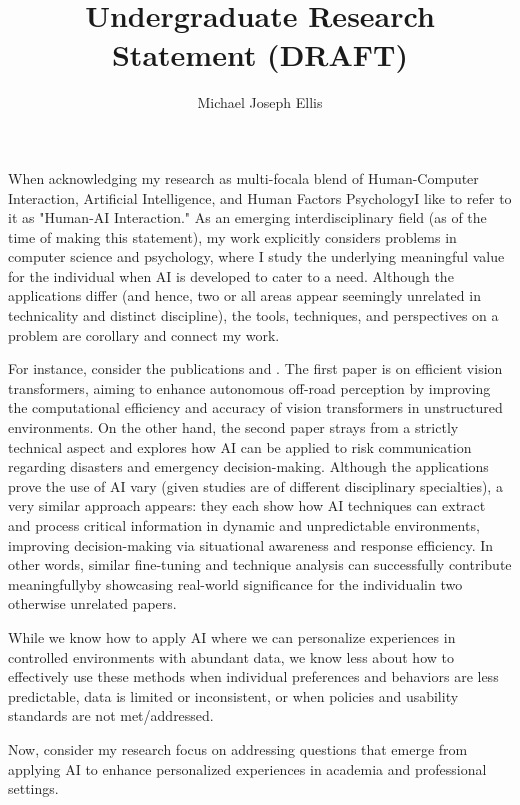 \documentclass{article}
\title{Undergraduate Research Statement (DRAFT)}
\author{Michael Joseph Ellis}
\date{}
\begin{document}
\maketitle

\indent When acknowledging my research as multi-focal\textemdash a blend of Human-Computer Interaction, Artificial Intelligence, and Human Factors Psychology\textemdash I like to refer to it as "Human-AI Interaction." As an emerging interdisciplinary field (as of the time of making this statement), my work explicitly considers problems in computer science and psychology, where I study the underlying meaningful value for the individual when AI is developed to cater to a need. Although the applications differ (and hence, two or all areas appear seemingly unrelated in technicality and distinct discipline), the tools, techniques, and perspectives on a problem are corollary and connect my work.

\indent For instance, consider the publications \cite{Efficient-Vision-Transformers-for-Autonomous-Systems} and \cite{AI-In-Disaster-Risk-Communication}. The first paper is on efficient vision transformers, aiming to enhance autonomous off-road perception by improving the computational efficiency and accuracy of vision transformers in unstructured environments. On the other hand, the second paper strays from a strictly technical aspect and explores how AI can be applied to risk communication regarding disasters and emergency decision-making. Although the applications prove the use of AI vary (given studies are of different disciplinary specialties), a very similar approach appears: they each show how AI techniques can extract and process critical information in dynamic and unpredictable environments, improving decision-making via situational awareness and response efficiency. In other words, similar fine-tuning and technique analysis can successfully contribute meaningfully\textemdash by showcasing real-world significance for the individual\textemdash in two otherwise unrelated papers.

\indent While we know how to apply AI where we can personalize experiences in controlled environments with abundant data, we know less about how to effectively use these methods when individual preferences and behaviors are less predictable, data is limited or inconsistent, or when policies and usability standards are not met/addressed. 

\vspace{10pt}\indent Now, consider my research focus on addressing questions that emerge from applying AI to enhance personalized experiences in academia and professional settings.  
\end{document}
